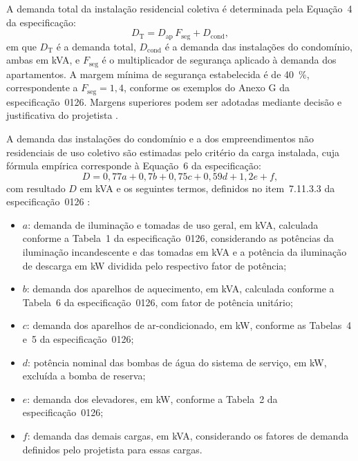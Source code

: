 A demanda total da instalação residencial coletiva é determinada pela Equação~4 da especificação:
\begin{equation}
 D_{\mathrm{T}}=D_{\mathrm{ap}}\,F_{\mathrm{seg}}+D_{\mathrm{cond}},
 \label{eq:demanda-total-0126}
\end{equation}
em que $D_{\mathrm{T}}$ é a demanda total, $D_{\mathrm{cond}}$ é a demanda das instalações do condomínio, ambas em kVA, e $F_{\mathrm{seg}}$ é o multiplicador de segurança aplicado à demanda dos apartamentos. A margem mínima de segurança estabelecida é de 40~\%, correspondente a $F_{\mathrm{seg}}=1{,}4$, conforme os exemplos do Anexo G da especificação~0126. Margens superiores podem ser adotadas mediante decisão e justificativa do projetista \cite[seção~7.11.2, p.~39--40, e Anexo G]{enel0126}.

A demanda das instalações do condomínio e a dos empreendimentos não residenciais de uso coletivo são estimadas pelo critério da carga instalada, cuja fórmula empírica corresponde à Equação~6 da especificação:
\begin{equation}
 D=0{,}77a+0{,}7b+0{,}75c+0{,}59d+1{,}2e+f,
 \label{eq:demanda-carga-instalada-0126}
\end{equation}
com resultado $D$ em kVA e os seguintes termos, definidos no item~7.11.3.3 da especificação~0126 \cite[p.~40--41]{enel0126}:
\begin{itemize}
 \item $a$: demanda de iluminação e tomadas de uso geral, em kVA, calculada conforme a Tabela~1 da especificação~0126, considerando as potências da iluminação incandescente e das tomadas em kVA e a potência da iluminação de descarga em kW dividida pelo respectivo fator de potência;
 \item $b$: demanda dos aparelhos de aquecimento, em kVA, calculada conforme a Tabela~6 da especificação~0126, com fator de potência unitário;
 \item $c$: demanda dos aparelhos de ar-condicionado, em kW, conforme as Tabelas~4 e~5 da especificação~0126;
 \item $d$: potência nominal das bombas de água do sistema de serviço, em kW, excluída a bomba de reserva;
 \item $e$: demanda dos elevadores, em kW, conforme a Tabela~2 da especificação~0126;
 \item $f$: demanda das demais cargas, em kVA, considerando os fatores de demanda definidos pelo projetista para essas cargas.
\end{itemize}

